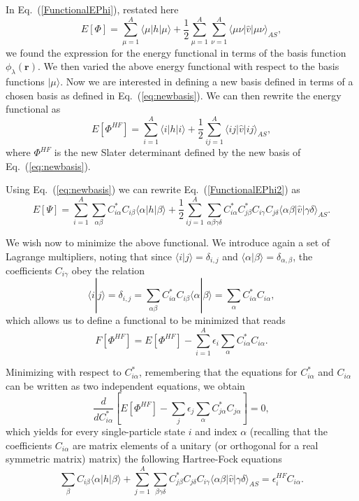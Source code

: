 \documentclass[%
oneside,                 %
final,                   %
10pt]{article}
\begin{document}
In Eq.~(\ref{FunctionalEPhi}), restated here
\[
  E[\Phi] 
  = \sum_{\mu=1}^A \langle \mu | h | \mu \rangle +
  \frac{1}{2}\sum_{{\mu}=1}^A\sum_{{\nu}=1}^A \langle \mu\nu|\hat{v}|\mu\nu\rangle_{AS},
\]
we found the expression for the energy functional in terms of the basis function $\phi_{\lambda}(\mathbf{r})$. We then  varied the above energy functional with respect to the basis functions $|\mu \rangle$. 
Now we are interested in defining a new basis defined in terms of
a chosen basis as defined in Eq.~(\ref{eq:newbasis}). We can then rewrite the energy functional as
\begin{equation}
  E[\Phi^{HF}] 
  = \sum_{i=1}^A \langle i | h | i \rangle +
  \frac{1}{2}\sum_{ij=1}^A\langle ij|\hat{v}|ij\rangle_{AS}, \label{FunctionalEPhi2}
\end{equation}
where $\Phi^{HF}$ is the new Slater determinant defined by the new basis of Eq.~(\ref{eq:newbasis}). 

Using Eq.~(\ref{eq:newbasis}) we can rewrite Eq.~(\ref{FunctionalEPhi2}) as 
\begin{equation}
  E[\Psi] 
  = \sum_{i=1}^A \sum_{\alpha\beta} C^*_{i\alpha}C_{i\beta}\langle \alpha | h | \beta \rangle +
  \frac{1}{2}\sum_{ij=1}^A\sum_{{\alpha\beta\gamma\delta}} C^*_{i\alpha}C^*_{j\beta}C_{i\gamma}C_{j\delta}\langle \alpha\beta|\hat{v}|\gamma\delta\rangle_{AS}. \label{FunctionalEPhi3}
\end{equation}

We wish now to minimize the above functional. We introduce again a set of Lagrange multipliers, noting that
since $\langle i | j \rangle = \delta_{i,j}$ and $\langle \alpha | \beta \rangle = \delta_{\alpha,\beta}$, 
the coefficients $C_{i\gamma}$ obey the relation
\[
 \langle i | j \rangle=\delta_{i,j}=\sum_{\alpha\beta} C^*_{i\alpha}C_{i\beta}\langle \alpha | \beta \rangle=
\sum_{\alpha} C^*_{i\alpha}C_{i\alpha},
\]
which allows us to define a functional to be minimized that reads
\begin{equation}
  F[\Phi^{HF}]=E[\Phi^{HF}] - \sum_{i=1}^A\epsilon_i\sum_{\alpha} C^*_{i\alpha}C_{i\alpha}.
\end{equation}

Minimizing with respect to $C^*_{i\alpha}$, remembering that the equations for $C^*_{i\alpha}$ and $C_{i\alpha}$
can be written as two  independent equations, we obtain
\[
\frac{d}{dC^*_{i\alpha}}\left[  E[\Phi^{HF}] - \sum_{j}\epsilon_j\sum_{\alpha} C^*_{j\alpha}C_{j\alpha}\right]=0,
\]
which yields for every single-particle state $i$ and index $\alpha$ (recalling that the coefficients $C_{i\alpha}$ are matrix elements of a unitary (or orthogonal for a real symmetric matrix) matrix)
the following Hartree-Fock equations
\[
\sum_{\beta} C_{i\beta}\langle \alpha | h | \beta \rangle+
\sum_{j=1}^A\sum_{\beta\gamma\delta} C^*_{j\beta}C_{j\delta}C_{i\gamma}\langle \alpha\beta|\hat{v}|\gamma\delta\rangle_{AS}=\epsilon_i^{HF}C_{i\alpha}.
\]
\end{document}
